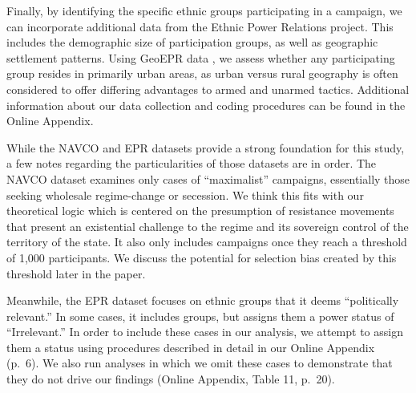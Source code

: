 \documentclass[
  letterpaper,
  DIV=11,
  numbers=noendperiod]{scrartcl}
\begin{document}
Finally, by identifying the specific ethnic groups participating in a
campaign, we can incorporate additional data from the Ethnic Power
Relations project. This includes the demographic size of participation
groups, as well as geographic settlement patterns. Using GeoEPR data
\autocite{Wucherpfennig2011}, we assess whether any participating group
resides in primarily urban areas, as urban versus rural geography is
often considered to offer differing advantages to armed and unarmed
tactics. Additional information about our data collection and coding
procedures can be found in the Online Appendix.

While the NAVCO and EPR datasets provide a strong foundation for this
study, a few notes regarding the particularities of those datasets are
in order. The NAVCO dataset examines only cases of ``maximalist''
campaigns, essentially those seeking wholesale regime-change or
secession. We think this fits with our theoretical logic which is
centered on the presumption of resistance movements that present an
existential challenge to the regime and its sovereign control of the
territory of the state. It also only includes campaigns once they reach
a threshold of 1,000 participants. We discuss the potential for
selection bias created by this threshold later in the paper.

Meanwhile, the EPR dataset focuses on ethnic groups that it deems
``politically relevant.'' In some cases, it includes groups, but assigns
them a power status of ``Irrelevant.'' In order to include these cases
in our analysis, we attempt to assign them a status using procedures
described in detail in our Online Appendix (p.~6). We also run analyses
in which we omit these cases to demonstrate that they do not drive our
findings (Online Appendix, Table 11, p.~20).
\end{document}
